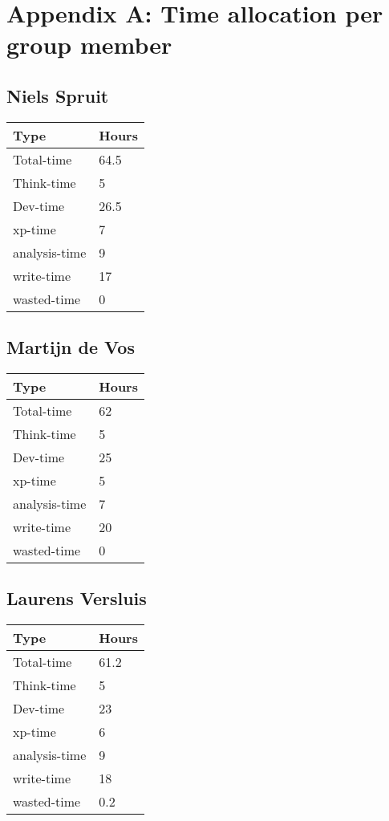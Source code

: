 \section{Appendix A: Time allocation per group member}
\label{apx:time-allocation}

	\subsection{Niels Spruit}
	
	\begin{tabular}{|l|l|}
		\hline 
		Type			& Hours	\\ \hline
		Total-time 		& 64.5	\\ \hline
		Think-time 		& 5		\\ \hline
		Dev-time   		& 26.5	\\ \hline
		xp-time    		& 7		\\ \hline
		analysis-time 	& 9		\\ \hline
		write-time		& 17	\\ \hline
		wasted-time 	& 0	\\ \hline
		
	\end{tabular}
	
	\subsection{Martijn de Vos}
		
	\begin{tabular}{|l|l|}
		\hline 
		Type			& Hours	\\ \hline
		Total-time 		& 62	\\ \hline
		Think-time 		& 5		\\ \hline
		Dev-time   		& 25	\\ \hline
		xp-time    		& 5		\\ \hline
		analysis-time 	& 7		\\ \hline
		write-time		& 20	\\ \hline
		wasted-time 	& 0	\\ \hline
		
	\end{tabular}
	
	\subsection{Laurens Versluis}
			
	\begin{tabular}{|l|l|}
		\hline 
		Type			& Hours	\\ \hline
		Total-time 		& 61.2	\\ \hline
		Think-time 		& 5		\\ \hline
		Dev-time   		& 23	\\ \hline
		xp-time    		& 6		\\ \hline
		analysis-time 	& 9		\\ \hline
		write-time		& 18	\\ \hline
		wasted-time 	& 0.2	\\ \hline
		
	\end{tabular}